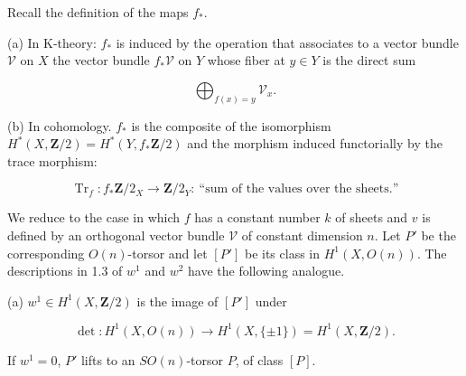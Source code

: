 \documentclass[9pt,twoside]{extarticle}
\begin{document}
{Recall the definition of the maps \(f_*\).\par

(a) In K-theory: \(f_*\) is induced by the operation that associates to a vector bundle \(\mathcal V\) on \(X\) the vector bundle \(f_*\mathcal V\) on \(Y\) whose fiber at \(y\in Y\) is the direct sum\par

\[
\bigoplus_{f(x)=y}\mathcal V_x.
\]

(b) In cohomology. \(f_*\) is the composite of the isomorphism \(H^*(X,\mathbf Z/2)=H^*(Y,f_*\mathbf Z/2)\) and the morphism induced functorially by the trace morphism:\par

\[
\operatorname{Tr}_f:f_*\mathbf Z/2_X\longrightarrow\mathbf Z/2_Y:\ \text{“sum of the values over the sheets.”}
\]

We reduce to the case in which \(f\) has a constant number \(k\) of sheets and \(v\) is defined by an orthogonal vector bundle \(\mathcal V\) of constant dimension \(n\). Let \(P'\) be the corresponding \(O(n)\)-torsor and let \([P']\) be its class in \(H^1(X,O(n))\). The descriptions in 1.3 of \(w^1\) and \(w^2\) have the following analogue.\par

(a) \(w^1\in H^1(X,\mathbf Z/2)\) is the image of \([P']\) under\par

\[
\det:H^1(X,O(n))\longrightarrow H^1(X,\{\pm1\})=H^1(X,\mathbf Z/2).
\]

If \(w^1=0\), \(P'\) lifts to an \(SO(n)\)-torsor \(P\), of class \([P]\).\par
}
\end{document}
